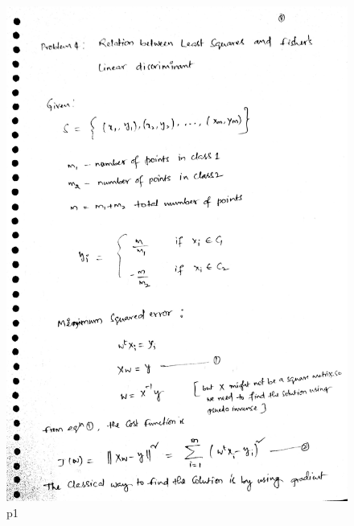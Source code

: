 \documentclass[10pt,a4paper]{article}
\begin{document}
\graphicspath{ {/images/} }
\begin{figure}[!h]
\includegraphics[scale=0.03]{images/p4A2_1.jpg}	
  \caption{p1}
  \label{fig:C34T2}
\end{figure}
\graphicspath{ {/images/} }
\end{document}
